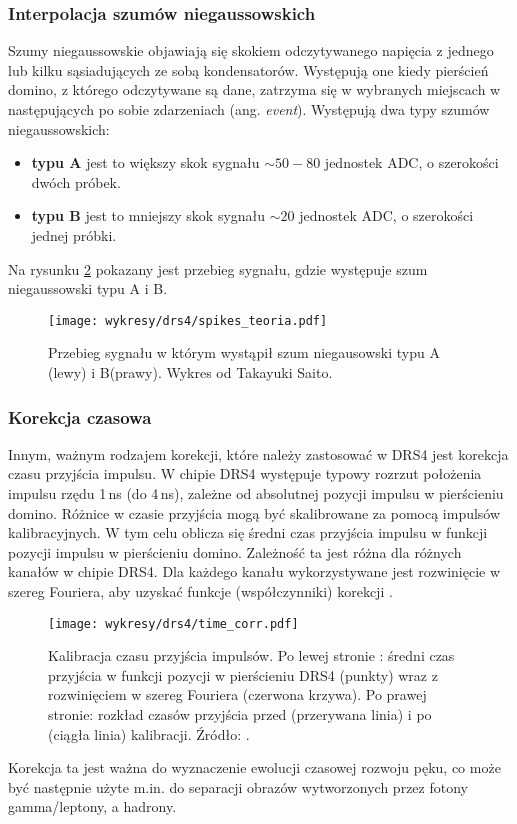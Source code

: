 \documentclass[a4paper,11pt,twoside]{article}
\begin{document}
\subsubsection{Interpolacja szumów niegaussowskich}
Szumy niegaussowskie objawiają się skokiem odczytywanego napięcia z jednego lub kilku sąsiadujących ze sobą kondensatorów. Występują one kiedy pierścień domino, z którego odczytywane są dane, zatrzyma się w wybranych miejscach w następujących po sobie zdarzeniach (ang. \textsl{event}). Występują dwa typy szumów niegaussowskich:
\begin{itemize}
\item {\bf{typu A}} jest to większy skok sygnału $\sim 50 - 80$ jednostek ADC, o szerokości dwóch próbek.
\item {\bf{typu B}} jest to mniejszy skok sygnału $\sim 20$ jednostek ADC, o szerokości jednej próbki.
\end{itemize}
Na rysunku \ref{fig:spike_corr} pokazany jest przebieg sygnału, gdzie występuje szum niegaussowski typu A i B. 
\begin{figure}[H] 
\centering
\texttt{[image: wykresy/drs4/spikes\_teoria.pdf]}
\caption{Przebieg sygnału w którym wystąpił szum niegausowski typu A (lewy) i B(prawy). Wykres od Takayuki Saito.}
\label{fig:spike_corr}
\end{figure}
\subsubsection{Korekcja czasowa}
Innym, ważnym rodzajem korekcji, które należy zastosować w DRS4 jest korekcja czasu przyjścia impulsu. W chipie DRS4 występuje typowy rozrzut położenia impulsu rzędu 1\,ns (do 4\,ns), zależne od absolutnej pozycji impulsu w pierścieniu domino. Różnice w czasie przyjścia mogą być skalibrowane za pomocą impulsów kalibracyjnych. W tym celu oblicza się średni czas przyjścia impulsu w funkcji pozycji impulsu w pierścieniu domino. Zależność ta jest różna dla różnych kanałów w chipie DRS4. Dla każdego kanału wykorzystywane jest rozwinięcie w szereg Fouriera, aby uzyskać funkcje (współczynniki) korekcji \cite{drs4_magic}. 
\begin{figure}[H] 
\centering
\texttt{[image: wykresy/drs4/time\_corr.pdf]}
\caption{Kalibracja czasu przyjścia impulsów. Po lewej stronie : średni czas przyjścia w funkcji pozycji w pierścieniu DRS4 (punkty) wraz z rozwinięciem w szereg Fouriera (czerwona krzywa). Po prawej stronie: rozkład czasów przyjścia przed (przerywana linia) i po (ciągła linia) kalibracji. Źródło: \cite{drs4_magic}. }
\label{fig:spike_corr}
\end{figure}
Korekcja ta jest ważna do wyznaczenie ewolucji czasowej rozwoju pęku, co może być następnie użyte m.in. do separacji obrazów wytworzonych przez fotony gamma/leptony, a hadrony. 
\end{document}
